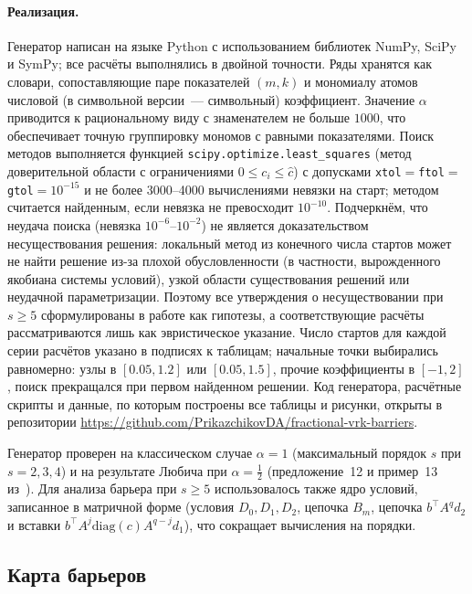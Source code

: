 \documentclass[11pt,a4paper]{article}
\theoremstyle{plain}
\theoremstyle{definition}
\begin{document}
\paragraph{Реализация.} Генератор написан на языке Python с использованием библиотек NumPy, SciPy и SymPy; все расчёты выполнялись в двойной точности. Ряды хранятся как словари, сопоставляющие паре показателей $(m,k)$ и мономиалу атомов числовой (в символьной версии~--- символьный) коэффициент. Значение $\alpha$ приводится к рациональному виду с знаменателем не больше $1000$, что обеспечивает точную группировку мономов с равными показателями. Поиск методов выполняется функцией \texttt{scipy.optimize.least\_squares} (метод доверительной области с ограничениями $0\le c_i\le\hat c$) с допусками \texttt{xtol}${}=$\texttt{ftol}${}=$\texttt{gtol}${}=10^{-15}$ и не более 3000--4000 вычислениями невязки на старт; методом считается найденным, если невязка не превосходит $10^{-10}$. Подчеркнём, что неудача поиска (невязка $10^{-6}$--$10^{-2}$) не является доказательством несуществования решения: локальный метод из конечного числа стартов может не найти решение из-за плохой обусловленности (в частности, вырожденного якобиана системы условий), узкой области существования решений или неудачной параметризации. Поэтому все утверждения о несуществовании при $s\ge5$ сформулированы в работе как гипотезы, а соответствующие расчёты рассматриваются лишь как эвристическое указание. Число стартов для каждой серии расчётов указано в подписях к таблицам; начальные точки выбирались равномерно: узлы в $[0.05,1.2]$ или $[0.05,1.5]$, прочие коэффициенты в $[-1,2]$, поиск прекращался при первом найденном решении. Код генератора, расчётные скрипты и данные, по которым построены все таблицы и рисунки, открыты в репозитории \url{https://github.com/PrikazchikovDA/fractional-vrk-barriers}.

Генератор проверен на классическом случае $\alpha=1$ (максимальный порядок $s$ при $s=2,3,4$) и на результате Любича при $\alpha=\frac12$ (предложение~12 и пример~13 из~\cite{Lubich1983}). Для анализа барьера при $s\ge5$ использовалось также ядро условий, записанное в матричной форме (условия $D_0,D_1,D_2$, цепочка $B_m$, цепочка $b^{\top}A^qd_2$ и вставки $b^{\top}A^j\mathrm{diag}(c)A^{q-j}d_1$), что сокращает вычисления на порядки.

\subsection{Карта барьеров}\label{sec:map}
\end{document}
